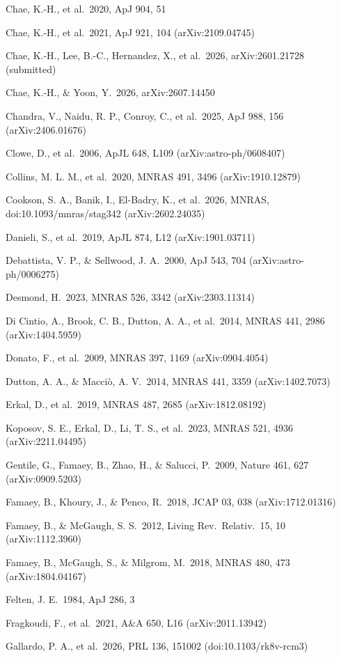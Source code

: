 \documentclass[
  10pt,
]{article}
\begin{document}
{\begin{list}{}{\setlength{\leftmargin}{1.5em}\setlength{\itemindent}{-1.5em}\setlength{\itemsep}{1pt}\setlength{\parsep}{0pt}}
\item Chae, K.-H., et al.\ 2020, ApJ 904, 51
\item Chae, K.-H., et al.\ 2021, ApJ 921, 104 (arXiv:2109.04745)
\item Chae, K.-H., Lee, B.-C., Hernandez, X., et al.\ 2026, arXiv:2601.21728 (submitted)
\item Chae, K.-H., \& Yoon, Y.\ 2026, arXiv:2607.14450
\item Chandra, V., Naidu, R. P., Conroy, C., et al.\ 2025, ApJ 988, 156 (arXiv:2406.01676)
\item Clowe, D., et al.\ 2006, ApJL 648, L109 (arXiv:astro-ph/0608407)
\item Collins, M. L. M., et al.\ 2020, MNRAS 491, 3496 (arXiv:1910.12879)
\item Cookson, S. A., Banik, I., El-Badry, K., et al.\ 2026, MNRAS, doi:10.1093/mnras/stag342 (arXiv:2602.24035)
\item Danieli, S., et al.\ 2019, ApJL 874, L12 (arXiv:1901.03711)
\item Debattista, V. P., \& Sellwood, J. A.\ 2000, ApJ 543, 704 (arXiv:astro-ph/0006275)
\item Desmond, H.\ 2023, MNRAS 526, 3342 (arXiv:2303.11314)
\item Di Cintio, A., Brook, C. B., Dutton, A. A., et al.\ 2014, MNRAS 441, 2986 (arXiv:1404.5959)
\item Donato, F., et al.\ 2009, MNRAS 397, 1169 (arXiv:0904.4054)
\item Dutton, A. A., \& Macci\`o, A. V.\ 2014, MNRAS 441, 3359 (arXiv:1402.7073)
\item Erkal, D., et al.\ 2019, MNRAS 487, 2685 (arXiv:1812.08192)
\item Koposov, S. E., Erkal, D., Li, T. S., et al.\ 2023, MNRAS 521, 4936 (arXiv:2211.04495)
\item Gentile, G., Famaey, B., Zhao, H., \& Salucci, P.\ 2009, Nature 461, 627 (arXiv:0909.5203)
\item Famaey, B., Khoury, J., \& Penco, R.\ 2018, JCAP 03, 038 (arXiv:1712.01316)
\item Famaey, B., \& McGaugh, S. S.\ 2012, Living Rev.\ Relativ.\ 15, 10 (arXiv:1112.3960)
\item Famaey, B., McGaugh, S., \& Milgrom, M.\ 2018, MNRAS 480, 473 (arXiv:1804.04167)
\item Felten, J. E.\ 1984, ApJ 286, 3
\item Fragkoudi, F., et al.\ 2021, A\&A 650, L16 (arXiv:2011.13942)
\item Gallardo, P. A., et al.\ 2026, PRL 136, 151002 (doi:10.1103/rk8v-rcm3)

\end{list}}
\end{document}
